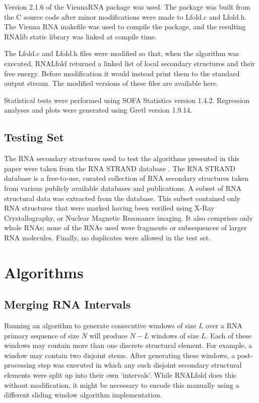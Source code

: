 \documentclass{cshonours}
\begin{document}
Version 2.1.6 of the ViennaRNA package was used. The package was built from the C source code after minor modifications were made to Lfold.c and Lfold.h. The Vienna RNA makefile was used to compile the package, and the resulting RNAlib static library was linked at compile time.

The Lfold.c and Lfold.h files were modified so that, when the algorithm was executed, RNALfold returned a linked list of local secondary structures and their free energy. Before modification it would instead print them to the standard output stream. The modified versions of these files are available here.

Statistical tests were performed using SOFA Statistics version 1.4.2. Regression analyses and plots were generated using Gretl version 1.9.14.


\subsection{Testing Set}
The RNA secondary structures used to test the algorithms presented in this paper were taken from the RNA STRAND database \cite{andronescu2008rna}. The RNA STRAND database is a free-to-use, curated collection of RNA secondary structures taken from various publicly available databases and publications. A subset of RNA structural data was extracted from the database. This subset contained only RNA structures that were marked having been verified using X-Ray Crystallography, or Nuclear Magnetic Resonance imaging. It also comprises only whole RNAs; none of the RNAs used were fragments or subsequences of larger RNA molecules. Finally, no duplicates were allowed in the test set.


\section{Algorithms}
\subsection{Merging RNA Intervals}
Running an algorithm to generate consecutive windows of size $L$ over a RNA primary sequence of size $N$ will produce $N-L$ windows of size $L$. Each of these windows may contain more than one discrete structural element. For example, a window may contain two disjoint stems. After generating these windows, a post-processing step was executed in which any such disjoint secondary structural elements were split up into their own `intervals'. While RNALfold does this without modification, it might be necessary to encode this manually using a different sliding window algorithm implementation.
\end{document}
